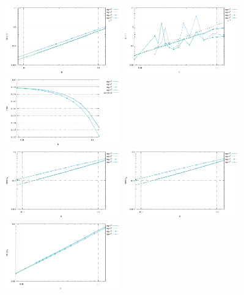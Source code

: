 \begin{center}
\includegraphics[width=5cm]{python_codes/fieldstone_75/results/mms3D/errors_v.pdf}
\includegraphics[width=5cm]{python_codes/fieldstone_75/results/mms3D/errors_p.pdf}
\includegraphics[width=5cm]{python_codes/fieldstone_75/results/mms3D/vrms.pdf}\\
\includegraphics[width=5cm]{python_codes/fieldstone_75/results/mms3D/errors_exx}
\includegraphics[width=5cm]{python_codes/fieldstone_75/results/mms3D/errors_eyy}
\includegraphics[width=5cm]{python_codes/fieldstone_75/results/mms3D/errors_ezz}\\

\end{center}
